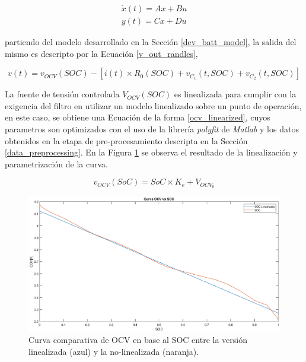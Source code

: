 \documentclass[10pt, a4paper]{article}
\begin{document}
\begin{align}
    \dot{x}(t) = Ax+Bu	\nonumber\\
    y(t)=Cx+Du
    \label{ss_model_generic}	
\end{align}

partiendo del modelo desarrollado en la Secci\'on \ref{dev_batt_model}, la
salida del mismo es descripto por la Ecuaci\'on \ref{v_out_randles},

\begin{equation}
    v(t) = v_{OCV}(SOC) - \left[i(t) \times R_0\left(SOC\right)  + v_{C_1}\left(t,
    SOC\right) + v_{C_2}\left(t, SOC\right)\right] \label{v_out_randles}
\end{equation}

\noindent La fuente de tensión controlada $V_{OCV}(SOC)$ es linealizada para 
cumplir con la exigencia del filtro en utilizar un modelo linealizado sobre un
punto de operaci\'on, en este caso, se obtiene una Ecuaci\'on de la forma
\ref{ocv_linearized}, cuyos parametros son optimizados con el uso de la
librer\'ia \emph{polyfit} de \emph{Matlab} y los datos obtenidos en la etapa de
pre-procesamiento descripta en la Secci\'on \ref{data_preprocessing}. En la 
Figura \ref{soc_linealized} se observa el resultado de la linealizaci\'on y
parametrizaci\'on de la curva.

\begin{equation}
    v_{OCV}(SoC) = SoC \times K_e + V_{OCV_0} 
    \label{ocv_linearized}
\end{equation}

\begin{figure}[h!]
    \begin{center}
	\includegraphics[width=1\textwidth]{SOC_vs_OCV.eps}
    \caption{Curva comparativa de \acrshort{OCV} en base al \acrshort{SOC} 
    entre la versi\'on linealizada (azul) y la no-linealizada (naranja).} 
	\label{soc_linealized}
    \end{center}
\end{figure}
\FloatBarrier
\end{document}
